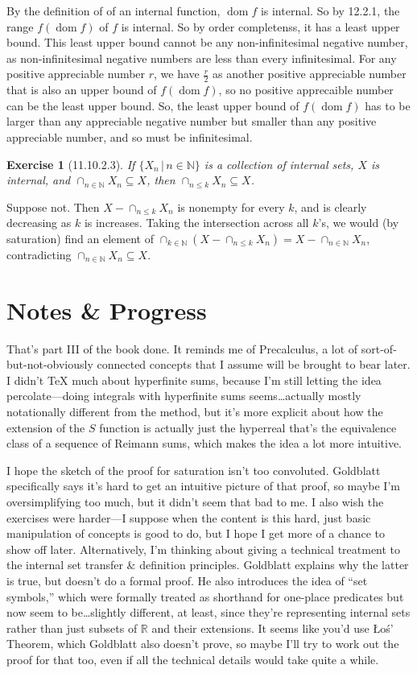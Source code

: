 \documentclass{article}
\newcommand{\sthat}{\,|\,}
\newcommand{\reals}{\mathbb{R}}
\newcommand{\nats}{\mathbb{N}}
\DeclareMathOperator{\dom}{dom}
\newtheorem*{exercise}{Exercise}
\begin{document}
By the definition of of an internal function, $\dom f$ is internal. So by 12.2.1, the range $f(\dom f)$ of $f$ is internal. So by order completenss, it has a least upper bound. This least upper bound cannot be any non-infinitesimal negative number, as non-infinitesimal negative numbers are less than every infinitesimal. For any positive appreciable number $r$, we have $\frac{r}{2}$ as another positive appreciable number that is also an upper bound of $f(\dom f)$, so no positive apprecaible number can be the least upper bound. So, the least upper bound of $f(\dom f)$ has to be larger than any appreciable negative number but smaller than any positive appreciable number, and so must be infinitesimal.

\begin{exercise}[11.10.2.3]
    If $\{X_n \sthat n \in \nats\}$ is a collection of internal sets, $X$ is internal, and $\cap_{n \in \nats} X_n \subseteq X$, then $\cap_{n \leq k} X_n \subseteq X$.
\end{exercise}

Suppose not. Then $X - \cap_{n \leq k} X_n$ is nonempty for every $k$, and is clearly decreasing as $k$ is increases. Taking the intersection across all $k$'s, we would (by saturation) find an element of $\cap_{k \in \nats}\left(X - \cap_{n \leq k} X_n\right) = X - \cap_{n \in \nats} X_n$, contradicting $\cap_{n \in \nats} X_n \subseteq X$. 

\section*{Notes \& Progress}

That's part III of the book done. It reminds me of Precalculus, a lot of sort-of-but-not-obviously connected concepts that I assume will be brought to bear later. I didn't TeX much about hyperfinite sums, because I'm still letting the idea percolate---doing integrals with hyperfinite sums seems\dots actually mostly notationally different from the method, but it's more explicit about how the extension of the $S$ function is actually just the hyperreal that's the equivalence class of a sequence of Reimann sums, which makes the idea a lot more intuitive.

I hope the sketch of the proof for saturation isn't too convoluted. Goldblatt specifically says it's hard to get an intuitive picture of that proof, so maybe I'm oversimplifying too much, but it didn't seem that bad to me. I also wish the exercises were harder---I suppose when the content is this hard, just basic manipulation of concepts is good to do, but I hope I get more of a chance to show off later. Alternatively, I'm thinking about giving a technical treatment to the internal set transfer \& definition principles. Goldblatt explains why the latter is true, but doesn't do a formal proof. He also introduces the idea of ``set symbols,'' which were formally treated as shorthand for one-place predicates but now seem to be\dots slightly different, at least, since they're representing internal sets rather than just subsets of $\reals$ and their extensions. It seems like you'd use \L o\'s' Theorem, which Goldblatt also doesn't prove, so maybe I'll try to work out the proof for that too, even if all the technical details would take quite a while.
\end{document}
